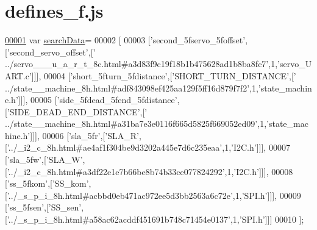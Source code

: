 \hypertarget{defines__f_8js_source}{}\section{defines\+\_\+f.\+js}
\label{defines__f_8js_source}

\begin{DoxyCode}
\hypertarget{defines__f_8js_source.tex_l00001}{}\hyperlink{defines__f_8js_ad01a7523f103d6242ef9b0451861231e}{00001} var \hyperlink{defines__f_8js_ad01a7523f103d6242ef9b0451861231e}{searchData}=
00002 [
00003   [\textcolor{stringliteral}{'second\_5fservo\_5foffset'},[\textcolor{stringliteral}{'second\_servo\_offset'},[\textcolor{stringliteral}{'
      ../servo\_\_\_u\_a\_r\_t\_8c.html#a3d83f9c19f18b1b475628ad1b8ba8fc7'},1,\textcolor{stringliteral}{'servo\_UART.c'}]]],
00004   [\textcolor{stringliteral}{'short\_5fturn\_5fdistance'},[\textcolor{stringliteral}{'SHORT\_TURN\_DISTANCE'},[\textcolor{stringliteral}{'
      ../state\_\_machine\_8h.html#adf843098ef425aa129f5ff16d879f7f2'},1,\textcolor{stringliteral}{'state\_machine.h'}]]],
00005   [\textcolor{stringliteral}{'side\_5fdead\_5fend\_5fdistance'},[\textcolor{stringliteral}{'SIDE\_DEAD\_END\_DISTANCE'},[\textcolor{stringliteral}{'
      ../state\_\_machine\_8h.html#a31ba7e3e0116f665d5825f669052ed09'},1,\textcolor{stringliteral}{'state\_machine.h'}]]],
00006   [\textcolor{stringliteral}{'sla\_5fr'},[\textcolor{stringliteral}{'SLA\_R'},[\textcolor{stringliteral}{'../\_i2\_c\_8h.html#ae4af1f304be9d3202a445e7d6c235eaa'},1,\textcolor{stringliteral}{'I2C.h'}]]],
00007   [\textcolor{stringliteral}{'sla\_5fw'},[\textcolor{stringliteral}{'SLA\_W'},[\textcolor{stringliteral}{'../\_i2\_c\_8h.html#a3df22e1e7b66be8b74b33ce077824292'},1,\textcolor{stringliteral}{'I2C.h'}]]],
00008   [\textcolor{stringliteral}{'ss\_5fkom'},[\textcolor{stringliteral}{'SS\_kom'},[\textcolor{stringliteral}{'../\_s\_p\_i\_8h.html#acbbd0eb471ac972ee5d3bb2563a6c72e'},1,\textcolor{stringliteral}{'SPI.h'}]]],
00009   [\textcolor{stringliteral}{'ss\_5fsen'},[\textcolor{stringliteral}{'SS\_sen'},[\textcolor{stringliteral}{'../\_s\_p\_i\_8h.html#a58ac62acddf451691b748c71454e0137'},1,\textcolor{stringliteral}{'SPI.h'}]]]
00010 ];
\end{DoxyCode}
